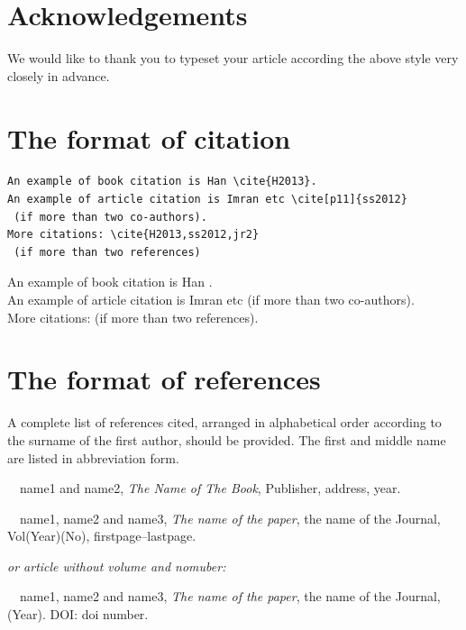 \documentclass{uestcMath}
\begin{document}
\section*{Acknowledgements}
We would like to thank you to typeset your article according the above style very closely in
advance.


\section*{The format of citation}
\begin{verbatim}
An example of book citation is Han \cite{H2013}.
An example of article citation is Imran etc \cite[p11]{ss2012}
 (if more than two co-authors).
More citations: \cite{H2013,ss2012,jr2}
 (if more than two references)
 \end{verbatim}

\vskip 2mm
\vskip 2mm
\noindent An example of book citation is Han \cite{H2013}. \\
An example of article citation is  Imran etc \cite[p. 11-13]{ss2012}
 (if more than two co-authors).\\
More citations: \cite{H2013,ss2012,ll2012} (if more than two references).

\section*{The format of references}
A complete list of references cited, arranged in alphabetical order according to the surname of the first
author, should be provided. The first and middle name are listed in abbreviation form.

\vskip 3mm
\vskip 2mm
\noindent [1] ~~name1 and name2,  {\em The Name of The Book}, Publisher, address, year.

\vskip 3mm
\vskip 2mm
\noindent [2] ~~name1, name2 and name3, {\em The name of the paper}, the name of the Journal, Vol(Year)(No), firstpage--lastpage.\par
\vskip 2mm
 {\it or article without volume and nomuber:}\par
\vskip 2mm
\noindent [3] ~~name1, name2 and name3, {\em The name of the paper}, the name of the Journal, (Year). DOI: doi number.



\end{document}
